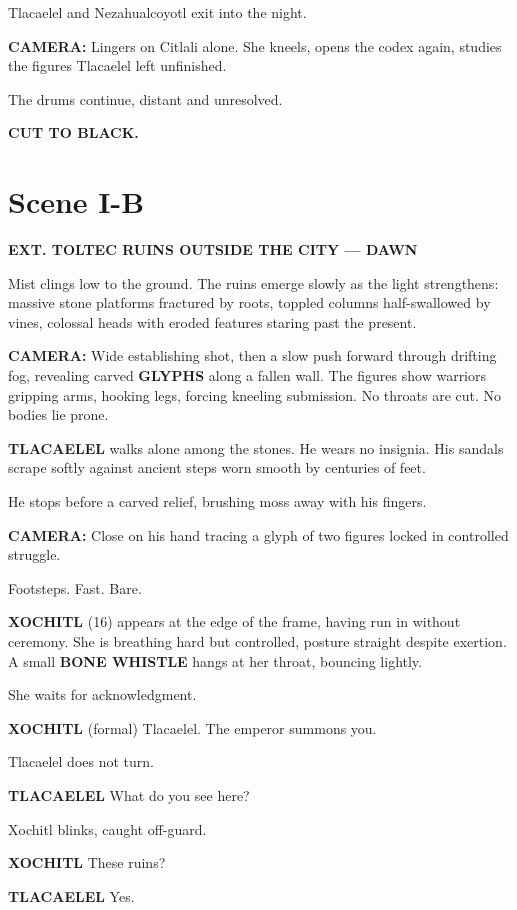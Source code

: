 \documentclass[12pt]{article}
\begin{document}
Tlacaelel and Nezahualcoyotl exit into the night.

\textbf{CAMERA:} Lingers on Citlali alone. She kneels, opens the codex again, studies the figures Tlacaelel left unfinished.

The drums continue, distant and unresolved.

\textbf{CUT TO BLACK.}

\section*{Scene I-B}

\textbf{EXT. TOLTEC RUINS OUTSIDE THE CITY — DAWN}

Mist clings low to the ground. The ruins emerge slowly as the light strengthens: massive stone platforms fractured by roots, toppled columns half-swallowed by vines, colossal heads with eroded features staring past the present.

\textbf{CAMERA:} Wide establishing shot, then a slow push forward through drifting fog, revealing carved \textbf{GLYPHS} along a fallen wall. The figures show warriors gripping arms, hooking legs, forcing kneeling submission. No throats are cut. No bodies lie prone.

\textbf{TLACAELEL} walks alone among the stones. He wears no insignia. His sandals scrape softly against ancient steps worn smooth by centuries of feet.

He stops before a carved relief, brushing moss away with his fingers.

\textbf{CAMERA:} Close on his hand tracing a glyph of two figures locked in controlled struggle.

Footsteps. Fast. Bare.

\textbf{XOCHITL} (16) appears at the edge of the frame, having run in without ceremony. She is breathing hard but controlled, posture straight despite exertion. A small \textbf{BONE WHISTLE} hangs at her throat, bouncing lightly.

She waits for acknowledgment.

\textbf{XOCHITL}  
(formal)  
Tlacaelel. The emperor summons you.

Tlacaelel does not turn.

\textbf{TLACAELEL}  
What do you see here?

Xochitl blinks, caught off-guard.

\textbf{XOCHITL}  
These ruins?

\textbf{TLACAELEL}  
Yes.
\end{document}
